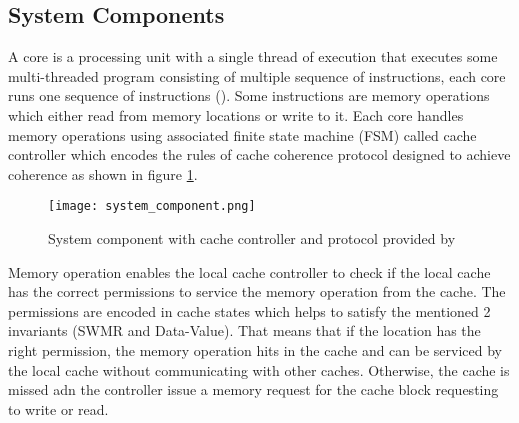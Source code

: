 \subsection{System Components}
A core is a processing unit with a single thread of execution that executes some multi-threaded program consisting of multiple sequence of instructions, each core runs one sequence of instructions (\citealp*{hay2012mesif}).
Some instructions are memory operations which either read from memory locations or write to it. Each core handles memory operations using associated finite state machine (FSM) called cache controller which encodes the rules of cache coherence protocol designed to achieve coherence
as shown in figure \ref*{fig:system_component}.

\begin{figure}[h]
        \centering
        \texttt{[image: system\_component.png]}
        \caption{\label{fig:system_component} System component with cache controller and protocol provided by \citealp{hay2012mesif}}
\end{figure}
\newpage
Memory operation enables the local cache controller to check if the local cache has the correct permissions to service the memory operation from the cache. The permissions are encoded in cache states which helps to
satisfy the mentioned 2 invariants (SWMR and Data-Value). That means that if the location has the right permission, the memory operation hits in the cache and 
can be serviced by the local cache without communicating with other caches. Otherwise, the cache is missed adn the controller issue a memory request for the cache block requesting to write or read.

